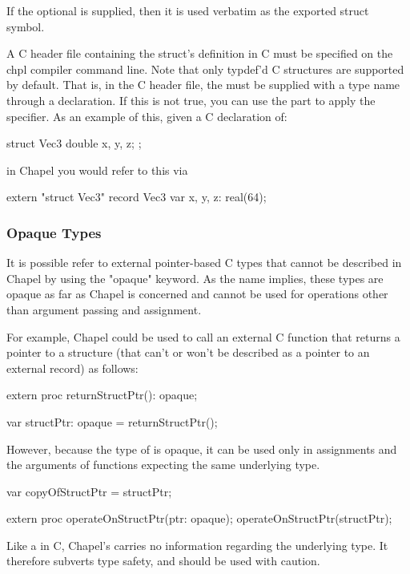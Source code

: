 If the optional  is supplied, then it is used verbatim as
the exported struct symbol.

A C header file containing the struct's definition in C must be specified on the
chpl compiler command line.  Note that only typdef'd C structures are supported
by default.  That is, in the C header file, the  must be supplied
with a type name through a  declaration. If this is not true, you
can use the  part to apply the  specifier.
As an example of this, given a C declaration of:

\begin{chapel}
  struct Vec3 {
    double x, y, z;
  };
\end{chapel}

in Chapel you would refer to this  via

\begin{chapel}
  extern "struct Vec3" record Vec3 {
    var x, y, z: real(64);
  }
\end{chapel}


\subsubsection{Opaque Types}
\label{Opaque_Types}

It is possible refer to external pointer-based C types that cannot be
described in Chapel by using the "opaque" keyword.  As the name implies,
these types are opaque as far as Chapel is concerned and cannot be
used for operations other than argument passing and assignment.

For example, Chapel could be used to call an external C function that
returns a pointer to a structure (that can't or won't be described as
a pointer to an external record) as follows:
\begin{chapel}
    extern proc returnStructPtr(): opaque;

    var structPtr: opaque = returnStructPtr();
\end{chapel}

However, because the type of  is opaque, it can be used only in
assignments and the arguments of functions expecting the same underlying type.
\begin{chapel}
    var copyOfStructPtr = structPtr;

    extern proc operateOnStructPtr(ptr: opaque);
    operateOnStructPtr(structPtr);
\end{chapel}
\noindent
Like a  in C, Chapel's  carries no information
regarding the underlying type.  It therefore subverts type safety, and should be
used with caution.

